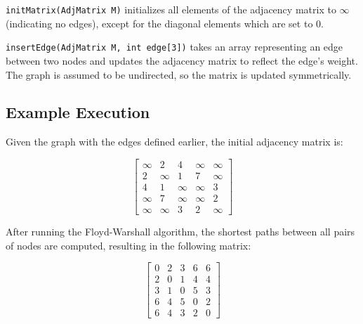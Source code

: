 \documentclass{book}
\begin{document}
\texttt{initMatrix(AdjMatrix M)} initializes all elements of the adjacency matrix to \(\infty\) (indicating no edges), except for the diagonal elements which are set to 0. 

\texttt{insertEdge(AdjMatrix M, int edge[3])} takes an array representing an edge between two nodes and updates the adjacency matrix to reflect the edge’s weight. The graph is assumed to be undirected, so the matrix is updated symmetrically.

\subsection{Example Execution}

Given the graph with the edges defined earlier, the initial adjacency matrix is:

\[
\begin{bmatrix}
\infty & 2 & 4 & \infty & \infty \\
2 & \infty & 1 & 7 & \infty \\
4 & 1 & \infty & \infty & 3 \\
\infty & 7 & \infty & \infty & 2 \\
\infty & \infty & 3 & 2 & \infty
\end{bmatrix}
\]

After running the Floyd-Warshall algorithm, the shortest paths between all pairs of nodes are computed, resulting in the following matrix:

\[
\begin{bmatrix}
0 & 2 & 3 & 6 & 6 \\
2 & 0 & 1 & 4 & 4 \\
3 & 1 & 0 & 5 & 3 \\
6 & 4 & 5 & 0 & 2 \\
6 & 4 & 3 & 2 & 0
\end{bmatrix}
\]
\end{document}

